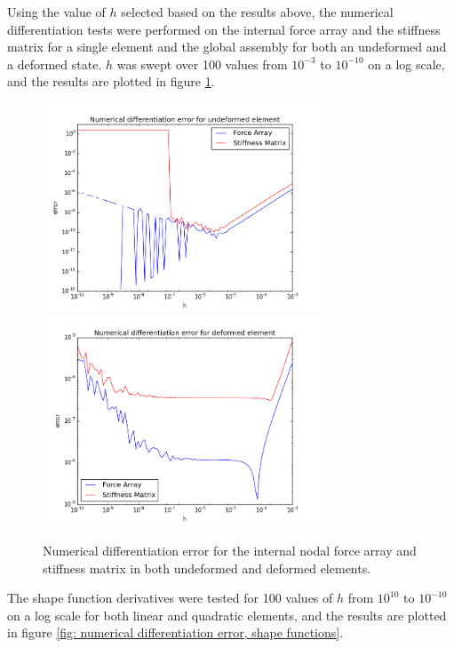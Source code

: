 \documentclass[]{spie}  %
\begin{document}
Using the value of $h$ selected based on the results above, the numerical differentiation tests were performed on the internal force array and the stiffness matrix for a single element and the global assembly for both an undeformed and a deformed state. $h$ was swept over 100 values from $10^{-3}$ to $10^{-10}$ on a log scale, and the results are plotted in figure \ref{fig: numerical differentiation error, force and stiffness}.

\begin{figure}[h]
	\centering
	\includegraphics[width=3.25in]{error_undeformed.png} \quad
	\includegraphics[width=3.25in]{error_deformed.png} 
	\caption{Numerical differentiation error for the internal nodal force array and stiffness matrix in both undeformed and deformed elements.} 
	\label{fig: numerical differentiation error, force and stiffness}
\end{figure}

The shape function derivatives were tested for 100 values of $h$ from $10^{10}$ to $10^{-10}$ on a log scale for both linear and quadratic elements, and the results are plotted in figure \ref{fig: numerical differentiation error, shape functions}.
\end{document}
